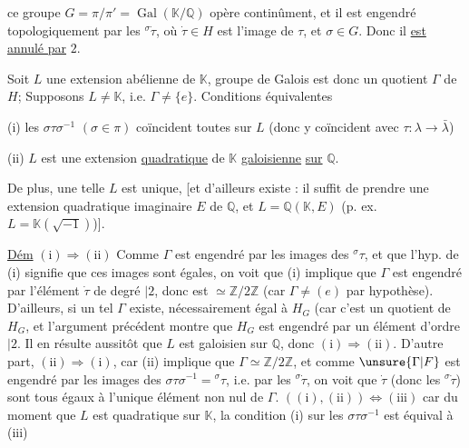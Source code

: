 ce groupe $G=\pi/\pi'=\operatorname{Gal}(\mathbb K/\mathbb Q)$ opère continûment, et
il est engendré topologiquement par les $ {}^\sigma\dot\tau$, où $\dot\tau\in H$
est l'image de $\tau$, et $\sigma\in G$. Donc il \uline{est annulé par} $2$.

\margin{$\left[\rule{0pt}{9em}\right.$}Soit $L$ une extension abélienne de $\mathbb K$,  
groupe de Galois est donc un quotient $\Gamma$ de $H$; 
Supposons $L\ne\mathbb K$, i.e. $\Gamma\ne\{e\}$. Conditions équivalentes

(i) les $\sigma\tau\sigma^{-1}$ $(\sigma\in\pi)$ coïncident toutes sur $L$
(donc y coïncident avec $\tau:\lambda\longrightarrow\bar\lambda$)

(ii) $L$ est une extension \uline{quadratique} de $\mathbb K$ \uline{galoisienne}
\uline{sur} $\mathbb Q$.

 

De plus, une telle $L$  est unique, [et
d'ailleurs existe : il suffit de prendre une extension
quadratique imaginaire $E$ de $\mathbb Q$, et $L=\mathbb Q(\mathbb K,E)$
(p. ex. $L=\mathbb K(\sqrt{-1})$)].

\uline{Dém} $\mathrm{(i)}\Rightarrow\mathrm{(ii)}$ Comme $\Gamma$ est engendré par les images
\deleted{$\unsure{{}^\sigma\dot\tau}$} des $ {}^\sigma\tau$,  et que l'hyp. de (i) signifie que
ces images sont égales, on voit que (i) implique que
$\Gamma$ est engendré par l'élément $\dot\tau$ de degré $\mid 2$, donc est
$\simeq\mathbb Z/2\mathbb Z$ (car $\Gamma\ne(e)$ par hypothèse). D'ailleurs, si un
tel $\Gamma$ existe,   nécessairement égal à $H_G$ (car 
c'est un quotient de $H_G$, et l'argument précédent montre
que  $H_G$ est engendré par un élément d'ordre $\mid2$. 
 Il en résulte aussitôt que $L$ est galoisien
sur $\mathbb Q$, donc $\mathrm{(i)}\Rightarrow\mathrm{(ii)}$. D'autre part, $\mathrm{(ii)}\Rightarrow\mathrm{(i)}$, car
(ii) implique que $\Gamma\simeq\mathbb Z/2\mathbb Z$, et comme $\unsure{\Gamma|F}$ est engendré par les
images des $\sigma\tau\sigma^{-1}={}^{\sigma}\tau$, i.e. par les $ {}^\sigma\dot\tau$, on voit que
$\dot\tau$ (donc les $ {}^\sigma\dot\tau$) sont tous égaux à l'unique élément non nul de $\Gamma$.
$(\mathrm{(i)},\mathrm{(ii)})\Longleftrightarrow\mathrm{(iii)}$ car du moment que $L$ est quadratique sur $\mathbb K$,
la condition (i) sur les $\sigma\tau\sigma^{-1}$ est  équival à (iii)
